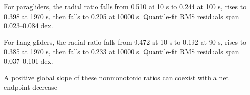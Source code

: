 For paragliders, the radial ratio falls from 0.510 at 10 s to 0.244 at 100 s, rises to 0.398 at 1970 s, then falls to 0.205 at 10000 s. Quantile-fit RMS residuals span 0.023--0.084 dex.

For hang gliders, the radial ratio falls from 0.472 at 10 s to 0.192 at 90 s, rises to 0.385 at 1970 s, then falls to 0.233 at 10000 s. Quantile-fit RMS residuals span 0.037--0.101 dex.

A positive global slope of these nonmonotonic ratios can coexist with a net endpoint decrease.
